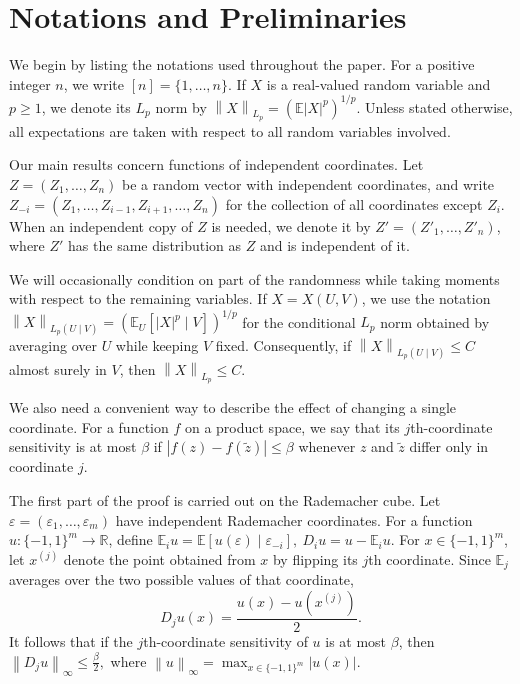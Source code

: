 \documentclass[11pt]{article}
\newcommand{\E}{\mathbb{E}}
\newcommand{\norm}[1]{\left\lVert #1\right\rVert}
\newcommand{\abs}[1]{\left\lvert #1\right\rvert}
\begin{document}
\section{Notations and Preliminaries}\label{sec:preliminaries}

We begin by listing the notations used throughout the paper. For a positive integer $n$, we write $[n]=\{1,\ldots,n\}$. 
If $X$ is a real-valued random variable and $p\ge1$, we denote its $L_p$ norm by $\norm{X}_{L_p} = \left(\E\abs{X}^p\right)^{1/p}.$
Unless stated otherwise, all expectations are taken with respect to all random variables involved.

Our main results concern functions of independent coordinates. Let
$Z=(Z_1,\ldots,Z_n)$ be a random vector with independent coordinates, and
write
\(
Z_{-i}
=
(Z_1,\ldots,Z_{i-1},Z_{i+1},\ldots,Z_n)
\)
for the collection of all coordinates except $Z_i$. When an independent copy
of $Z$ is needed, we denote it by $Z'=(Z'_1,\ldots,Z'_n)$, where $Z'$ has the
same distribution as $Z$ and is independent of it.

We will occasionally condition on part of the randomness while taking
moments with respect to the remaining variables. If $X=X(U,V)$, we use the
notation
\(
\norm{X}_{L_p(U\mid V)}
=
\left(
\E_U\!\left[\abs{X}^p\mid V\right]
\right)^{1/p}
\)
for the conditional $L_p$ norm obtained by averaging over $U$ while keeping
$V$ fixed. Consequently, if
$\norm{X}_{L_p(U\mid V)}\le C$ almost surely in $V$, then
$\norm{X}_{L_p}\le C$.

We also need a convenient way to describe the effect of changing a single
coordinate. For a function $f$ on a product space, we say that its
$j$th-coordinate sensitivity is at most $\beta$ if
\(
\abs{f(z)-f(\widetilde z)}
\le \beta
\)
whenever $z$ and $\widetilde z$ differ only in coordinate $j$.

The first part of the proof is carried out on the Rademacher cube. Let
$\varepsilon=(\varepsilon_1,\ldots,\varepsilon_m)$ have independent
Rademacher coordinates. For a function
$u:\{-1,1\}^m\to\mathbb R$, define
\(
\E_i u = \E\!\left[u(\varepsilon)\mid\varepsilon_{-i}\right],
\ 
D_i u = u-\E_i u.
\)
For $x\in\{-1,1\}^m$, let $x^{(j)}$ denote the point obtained from $x$ by
flipping its $j$th coordinate. Since $\E_j$ averages over the two possible
values of that coordinate,
\begin{equation}\label{eq:discrete-derivative}
D_j u(x) = \frac{u(x)-u(x^{(j)})}{2}.
\end{equation}
It follows that if the $j$th-coordinate sensitivity of $u$ is at most
$\beta$, then $\norm{D_j u}_\infty \le \frac{\beta}{2},$ where
$\norm{u}_\infty = \max_{x\in\{-1,1\}^m}\abs{u(x)}.$
\end{document}
